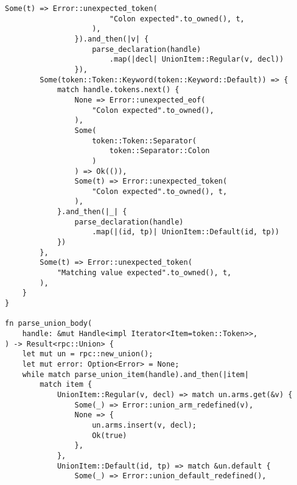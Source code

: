 \begin{lstlisting}[caption={Разбор объединения (часть 4)}, label={lst:rust_parser_union4}]
                    Some(t) => Error::unexpected_token(
                        "Colon expected".to_owned(), t,
                    ),
                }).and_then(|v| {
                    parse_declaration(handle)
                        .map(|decl| UnionItem::Regular(v, decl))
                }),
        Some(token::Token::Keyword(token::Keyword::Default)) => {
            match handle.tokens.next() {
                None => Error::unexpected_eof(
                    "Colon expected".to_owned(),
                ),
                Some(
                    token::Token::Separator(
                        token::Separator::Colon
                    )
                ) => Ok(()),
                Some(t) => Error::unexpected_token(
                    "Colon expected".to_owned(), t,
                ),
            }.and_then(|_| {
                parse_declaration(handle)
                    .map(|(id, tp)| UnionItem::Default(id, tp))
            })
        },
        Some(t) => Error::unexpected_token(
            "Matching value expected".to_owned(), t,
        ),
    }
}

fn parse_union_body(
    handle: &mut Handle<impl Iterator<Item=token::Token>>,
) -> Result<rpc::Union> {
    let mut un = rpc::new_union();
    let mut error: Option<Error> = None;
    while match parse_union_item(handle).and_then(|item|
        match item {
            UnionItem::Regular(v, decl) => match un.arms.get(&v) {
                Some(_) => Error::union_arm_redefined(v),
                None => {
                    un.arms.insert(v, decl);
                    Ok(true)
                },
            },
            UnionItem::Default(id, tp) => match &un.default {
                Some(_) => Error::union_default_redefined(),
\end{lstlisting}
\clearpage
